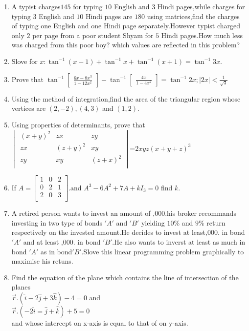 \documentclass[12pt,-letter paper]{article}
\providecommand{\mydet}[1]{\ensuremath{\begin{vmatrix}#1\end{vmatrix}}}
\providecommand{\myvec}[1]{\ensuremath{\begin{bmatrix}#1\end{bmatrix}}}
\providecommand{\brak}[1]{\ensuremath{\left(#1\right)}}
\begin{document}
\begin{enumerate}
 \item A typist charges\rupee$145$ for typing $10$ English and $3$ Hindi pages,while charges for typing $3$ English and $10$ Hindi pages are \rupee$180$ using matrices,find the charges of typing one English and one Hindi page separately.However typist charged only \rupee$2$  per page from a poor student Shyam for $5$ Hindi pages.How much less was charged from this poor boy? which values are reflected in this problem?

 \item Slove for $x:\tan^{-1}\brak{x-1}+\tan^{-1}x+\tan^{-1}\brak{x+1}=\tan^{-1}3x$.



 \item Prove that $\tan^{-1}\myvec{\frac{6x-8x^3}{1-12x^2}}-\tan^{-1}\myvec{\frac{4x}{1-4x^2}}=\tan^{-1}2x;|2x|<\frac{1}{\sqrt{3}}$



 \item Using the method of integration,find the area of the triangular region whose vertices are $\brak{2,-2},\brak{4,3}$ and $\brak{1,2}$.
   
 \item Using properties of determinants, prove that $\mydet{ \brak{x+y}^{2} & zx &  zy\\ zx & \brak{z+y}^{2} & xy\\ zy & xy & \brak{z+x}^{2}\\}$=$2xyz\brak{x+y+z}^{3}$





\item  If $A=\myvec{1 & 0 & 2 \\
	           0  & 2 & 1 \\
	            2 & 0 & 3 \\}$.and $A^3-6A^2+7A+kI_3=0$  find $k$.



  \item A retired person wants to invest an amount of ,000.his broker recommands investing in two type of bonds $'A'$ and $'B'$ yielding $10\%$ and $9\%$ return respectively on the invested amount.He decides to invest at least,000. in bond $'A'$ and at least ,000. in bond $'B'$.He also wants to inverst at least as much in bond $'A'$ as in bond$'B'$.Slove this linear programming problem graphically to maximise his retuns.


  \item Find the equation of the plane which contains the line of intersection of the planes\\
	  $\overset{\rightarrow}{r}.\brak{\hat{i}-2\hat{j}+3\hat{k}}-4=0$ and \\ $\overset{\rightarrow}{r}.\brak{-2\hat{i}=\hat{j}+\hat{k}}+5=0$\\ and whose intercept on x-axis is equal to that of on y-axis.
    


\end{enumerate}
\end{document}
